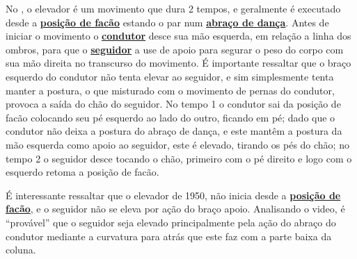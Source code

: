 No \AnoLivro, o elevador é um movimento que dura 2 tempos, e geralmente é
executado desde a \hyperref[def:facao-position]{\textbf{posição de facão}} 
estando o par num \hyperref[def:abracodedanca]{\textbf{abraço de dança}}.
Antes de iniciar o movimento o \hyperref[def:Condutor]{\textbf{condutor}} 
desce sua mão esquerda, em relação a linha dos ombros, 
para que o \hyperref[def:Seguidor]{\textbf{seguidor}}
a use de apoio para segurar o peso do corpo com sua mão direita no transcurso do movimento.
É importante ressaltar que o braço esquerdo do condutor não tenta elevar ao seguidor, 
e sim simplesmente tenta manter a postura,
o que misturado com o movimento de pernas do condutor,
provoca a saída do chão do seguidor.
No tempo 1 o condutor sai da posição de facão colocando seu pé esquerdo 
ao lado do outro, ficando em pé; dado que o condutor não deixa a postura do abraço de dança,
e este mantêm a postura da mão esquerda  como apoio ao seguidor, este é elevado, tirando os pés do chão;
no tempo 2 o seguidor desce tocando o chão, primeiro com o pé direito e logo com o esquerdo retoma a posição de facão.

É interessante ressaltar que o elevador de 1950, 
não inicia desde a \hyperref[def:facao-position]{\textbf{posição de facão}}, e 
o seguidor  não se eleva por ação do braço apoio.
Analisando o video, é ``provável'' que o seguidor seja elevado principalmente pela ação do abraço do condutor
mediante a curvatura para atrás que este faz com a parte baixa da coluna.


